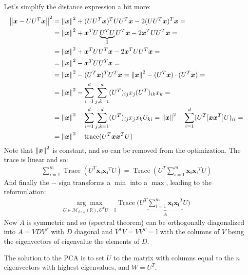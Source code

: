 \documentclass[../template.tex]{subfiles}
\begin{document}
\begin{itemize}
    Let's simplify the distance expression a bit more:
    \begin{align*}
        \norm{\bm{x} - U U^T \bm{x} }^2 &= \norm{\bm{x}}^2 + (UU^T\bm{x})^T UU^T \bm{x} - 2 (U U^T \bm{x})^T \bm{x} =\\
        &= \norm{\bm{x}}^2 + \bm{x}^T U \underbrace{U^T U}_{\mathbb{I}} U^T \bm{x} - 2 \bm{x}^T U U^T \bm{x} =\\
        &= \norm{\bm{x}}^2 + \bm{x}^T U U^T\bm{x} - 2\bm{x}^T U U^T\bm{x} =\\
        &= \norm{\bm{x}}^2 -\bm{x}^T U U^T \bm{x} =\\
        &= \norm{\bm{x}}^2 - (U^T \bm{x})^T U^T\bm{x} = \norm{\bm{x}}^2 - (U^T\bm{x}) \cdot (U^T \bm{x}) =\\
        &= \norm{\bm{x}}^2 - \sum_{i=1}^d \sum_{j,k=1}^d (U^T)_{ij} x_j (U^T)_{ik} x_k  =\\
        &= \norm{\bm{x}}^2 -\sum_{i=1}^d \sum_{j,k=1}^d (U^T)_{ij} x_j x_k U_{ki} = \norm{\bm{x}}^2 - \sum_{i=1}^d (U^T [\bm{x} \bm{x}^T]U)_{i i} =\\
        &= \norm{\bm{x}}^2 - \operatorname{trace}(U^T \bm{x} \bm{x}^T U) 
    \end{align*}
    Note that $\norm{\bm{x}}^2$ is constant, and so can be removed from the optimization. The trace is linear and so:
    \begin{align*}
        \sum_{i=1}^m \operatorname{Trace} (U^T \bm{x_i} \bm{x_i}^T U) = \operatorname{Trace} \left(U^T \sum_{i=1}^m \bm{x_i}\bm{x_i}^T U\right) 
    \end{align*} 
    And finally the $-$ sign transforms a $\min$ into a $\max$, leading to the reformulation:
    \begin{align} \label{eqn:PCA-2}
        \underset{U \in \mathcal{M}_{d \times n}(\mathbb{R}), U^T U = \mathbb{I}}{\arg\max} \operatorname{Trace} \Big(U^T\underbrace{ \sum_{i=1}^m \bm{x_i}\bm{x_i}^T }_{A}U\Big)
    \end{align}
    Now $A$ is symmetric and so (spectral theorem) can be orthogonally diagonalized into $A = VDV^T$ with $D$ diagonal and $V^TV = V V^T = \mathbb{I}$ with the columns of $V$ being the eigenvectors of eigenvalue the elements of $D$.

    The solution to the PCA is to set $U$ to the matrix with columns equal to the $n$ eigenvectors with highest eigenvalues, and $W=U^T$.


\end{itemize}
\end{document}
